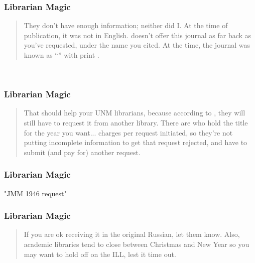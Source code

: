 \begin{frame}\frametitle{Librarian Magic}
\small{
\begin{quotation}
They don't have enough information; neither did I. At the time of publication, it was not in English.  doesn't offer this journal as far back as you've requested, under the name you cited. At the time, the journal was known as ``'' with print . 
\end{quotation}
}
\ 
\\[10pt]
\center
\href{https://translate.google.com/?sl=en&tl=ru&text=Prikladnaya\%20matematika\%20i\%20mekhanika\&op=translate}{}
\end{frame}
%
\begin{frame}\frametitle{Librarian Magic}
\small{
\begin{quotation}
That should help your UNM librarians, because according to , they will still have to request it from another library. There are  who hold the title for the year you want...  charges per request initiated, so they're not putting incomplete information to get that request rejected, and have to submit (and pay for) another request. 
\end{quotation}
}
\end{frame}
%

\begin{frame}\frametitle{Librarian Magic\jumpLittle}
\center
	\begin{overpic}[ scale = 0.225 ]
		{\pLocalGraphics "JMM 1946 request"}
	\end{overpic}
\end{frame}

\begin{frame}\frametitle{Librarian Magic}
\small{
\begin{quotation}
If you are ok receiving it in the original Russian, let them know. Also, academic libraries tend to close between Christmas and New Year so you may want to hold off on the ILL, lest it time out. 
\end{quotation}
}
\end{frame}

\endinput  %

